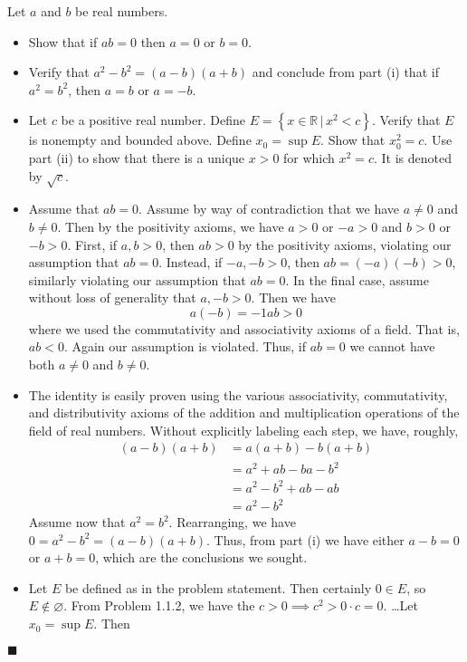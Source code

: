 \documentclass[12pt]{article}
\renewcommand{\qed}{\hfill$\blacksquare$}
\renewenvironment{proof}{\begin{addmargin}[1em]{0em}\begin{newproof}}{\end{newproof}\end{addmargin}\qed}
\newenvironment{problem}[2][Problem]{\begin{trivlist}
\item[\hskip \labelsep {\bfseries #1}\hskip \labelsep {\bfseries #2.}]}{\end{trivlist}}
\begin{document}
\begin{problem}{1.1.4}
Let $a$ and $b$ be real numbers.
\begin{itemize}
	\item Show that if $ab=0$ then $a=0$ or $b=0$.
	\item Verify that $a^2-b^2 = \left(a-b\right)\left(a+b\right)$ and conclude from part (i) that if $a^2=b^2$, then $a=b$ or $a=-b$.
	\item Let $c$ be a positive real number. Define $E=\left\{x\in \mathbb{R} \, | \, x^2 < c\right\}$. Verify that $E$ is nonempty and bounded above. Define $x_0 = \sup E$. Show that $x_0^2 = c$. Use part (ii) to show that there is a unique $x>0$ for which $x^2 = c$. It is denoted by $\sqrt{c}$.
\end{itemize}
\end{problem}
\begin{proof}
\begin{itemize}
	\item Assume that $ab=0$. Assume by way of contradiction that we have $a\neq 0$ and $b\neq 0$. Then by the positivity axioms, we have $a>0$ or $-a>0$ and $b>0$ or $-b>0$. First, if $a,b>0$, then $ab >0$ by the positivity axioms, violating our assumption that $ab=0$. Instead, if $-a,-b >0$, then $ab = \left(-a\right)\left(-b\right) > 0 $, similarly violating our assumption that $ab=0$. In the final case, assume without loss of generality that $a,-b>0$. Then we have \[ a\left(-b\right) = -1ab > 0 \] where we used the commutativity and associativity axioms of a field. That is, $ab <0$. Again our assumption is violated. Thus, if $ab=0$ we cannot have both $a\neq 0$ and $b\neq 0$.
	\item The identity is easily proven using the various associativity, commutativity, and distributivity axioms of the addition and multiplication operations of the field of real numbers. Without explicitly labeling each step, we have, roughly,
	\[ \begin{split}
		\left(a-b\right)\left(a+b\right) & = a\left(a+b\right)-b\left(a+b\right) \\
		& = a^2 + ab - ba -b^2 \\
		& = a^2 - b^2 + ab - ab \\
		& = a^2 - b^2
	\end{split} \]
Assume now that $a^2=b^2$. Rearranging, we have $0=a^2-b^2 = \left(a-b\right)\left(a+b\right)$. Thus, from part (i) we have either $a-b =0$ or $a+b=0$, which are the conclusions we sought.
\item Let $E$ be defined as in the problem statement. Then certainly $0 \in E$, so $E\notin \varnothing$. From Problem 1.1.2, we have the $c>0 \implies c^2 > 0\cdot c = 0$. \ldots Let $x_0 = \sup E$. Then 
\end{itemize}
\end{proof}
\end{document}
